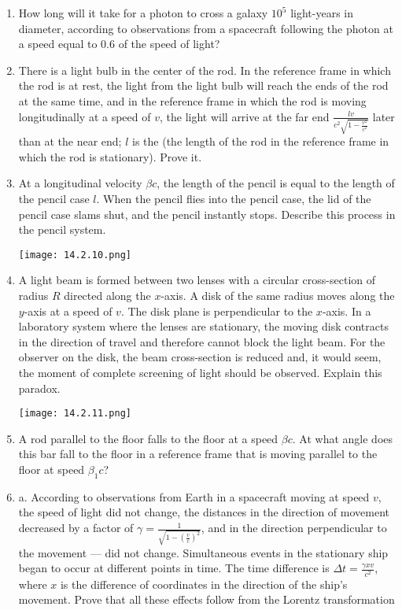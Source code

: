 \documentclass{article}
\begin{document}
\begin{enumerate}[label=14.2.\arabic*]
\item How long will it take for a photon to cross a galaxy $10^5$ light-years in diameter, according to observations from a spacecraft following the photon at a speed equal to $0.6$ of the speed of light?

\item There is a light bulb in the center of the rod. In the reference frame in which the rod is at rest, the light from the light bulb will reach the ends of the rod at the same time, and in the reference frame in which the rod is moving longitudinally at a speed of $v$, the light will arrive at the far end $\frac{lv}{c^2 \sqrt{1 - \frac{v^2}{c^2}}}$ later than at the near end; $l$ is the (the length of the rod in the reference frame in which the rod is stationary). Prove it.

\item At a longitudinal velocity $\beta c$, the length of the pencil is equal to the length of the pencil case $l$. When the pencil flies into the pencil case, the lid of the pencil case slams shut, and the pencil instantly stops. Describe this process in the pencil system.

\begin{center}
    \texttt{[image: 14.2.10.png]}
\end{center}


\item A light beam is formed between two lenses with a circular cross-section of radius $R$ directed along the $x$-axis. A disk of the same radius moves along the $y$-axis at a speed of $v$. The disk plane is perpendicular to the $x$-axis. In a laboratory system where the lenses are stationary, the moving disk contracts in the direction of travel and therefore cannot block the light beam. For the observer on the disk, the beam cross-section is reduced and, it would seem, the moment of complete screening of light should be observed. Explain this paradox.

\begin{center}
    \texttt{[image: 14.2.11.png]}
\end{center}

\item A rod parallel to the floor falls to the floor at a speed $\beta c$. At what angle does this bar fall to the floor in a reference frame that is moving parallel to the floor at speed $\beta_1c$?

\item a. According to observations from Earth in a spacecraft moving at speed $v$, the speed of light did not change, the distances in the direction of movement decreased by a factor of $\gamma = \frac{1}{\sqrt{1 - (\frac{v}{c})^2}}$, and in the direction perpendicular to the movement — did not change. Simultaneous events in the stationary ship began to occur at different points in time. The time difference is $\Delta t = \frac{\gamma x v}{c^2}$, where $x$ is the difference of coordinates in the direction of the ship's movement. Prove that all these effects follow from the Lorentz transformation


\end{enumerate}
\end{document}
